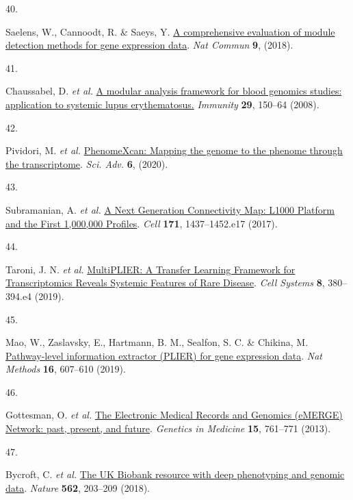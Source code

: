 \documentclass[
  a4paper,
]{article}
\newlength{\cslhangindent}
\newlength{\csllabelwidth}
\newlength{\cslentryspacingunit} %
\newenvironment{CSLReferences}[2] %
 {%
  \setlength{\parindent}{0pt}
  \ifodd #1
  \let\oldpar\par
  \def\par{\hangindent=\cslhangindent\oldpar}
  \fi
  \setlength{\parskip}{#2\cslentryspacingunit}
 }%
 {}
\newcommand{\CSLLeftMargin}[1]{\parbox[t]{\csllabelwidth}{#1}}
\newcommand{\CSLRightInline}[1]{\parbox[t]{\linewidth - \csllabelwidth}{#1}\break}
\begin{document}
\begin{CSLReferences}{0}{0}
\leavevmode{}%
\CSLLeftMargin{40. }%
\CSLRightInline{Saelens, W., Cannoodt, R. \& Saeys, Y. \href{https://doi.org/10.1038/s41467-018-03424-4}{A comprehensive evaluation of module detection methods for gene expression data}. \emph{Nat Commun} \textbf{9}, (2018).}

\leavevmode{}%
\CSLLeftMargin{41. }%
\CSLRightInline{Chaussabel, D. \emph{et al.} \href{https://doi.org/10.1016/j.immuni.2008.05.012}{A modular analysis framework for blood genomics studies: application to systemic lupus erythematosus.} \emph{Immunity} \textbf{29}, 150--64 (2008).}

\leavevmode{}%
\CSLLeftMargin{42. }%
\CSLRightInline{Pividori, M. \emph{et al.} \href{https://doi.org/10.1126/sciadv.aba2083}{PhenomeXcan: Mapping the genome to the phenome through the transcriptome}. \emph{Sci. Adv.} \textbf{6}, (2020).}

\leavevmode{}%
\CSLLeftMargin{43. }%
\CSLRightInline{Subramanian, A. \emph{et al.} \href{https://doi.org/10.1016/j.cell.2017.10.049}{A Next Generation Connectivity Map: L1000 Platform and the First 1,000,000 Profiles}. \emph{Cell} \textbf{171}, 1437--1452.e17 (2017).}

\leavevmode{}%
\CSLLeftMargin{44. }%
\CSLRightInline{Taroni, J. N. \emph{et al.} \href{https://doi.org/10.1016/j.cels.2019.04.003}{MultiPLIER: A Transfer Learning Framework for Transcriptomics Reveals Systemic Features of Rare Disease}. \emph{Cell Systems} \textbf{8}, 380--394.e4 (2019).}

\leavevmode{}%
\CSLLeftMargin{45. }%
\CSLRightInline{Mao, W., Zaslavsky, E., Hartmann, B. M., Sealfon, S. C. \& Chikina, M. \href{https://doi.org/10.1038/s41592-019-0456-1}{Pathway-level information extractor (PLIER) for gene expression data}. \emph{Nat Methods} \textbf{16}, 607--610 (2019).}

\leavevmode{}%
\CSLLeftMargin{46. }%
\CSLRightInline{Gottesman, O. \emph{et al.} \href{https://doi.org/10.1038/gim.2013.72}{The Electronic Medical Records and Genomics (eMERGE) Network: past, present, and future}. \emph{Genetics in Medicine} \textbf{15}, 761--771 (2013).}

\leavevmode{}%
\CSLLeftMargin{47. }%
\CSLRightInline{Bycroft, C. \emph{et al.} \href{https://doi.org/10.1038/s41586-018-0579-z}{The UK Biobank resource with deep phenotyping and genomic data}. \emph{Nature} \textbf{562}, 203--209 (2018).}


\end{CSLReferences}
\end{document}
